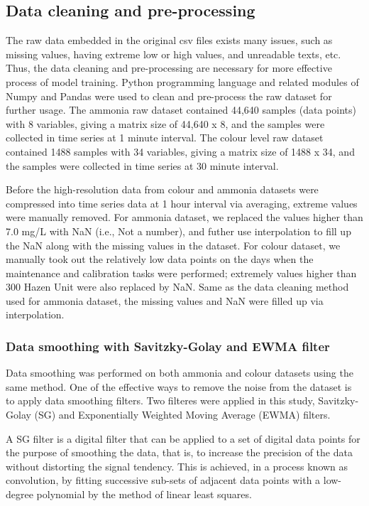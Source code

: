 \subsection{Data cleaning and pre-processing}
The raw data embedded in the original csv files exists many issues, such as missing values, having extreme low or high values, and unreadable texts, etc. Thus, the data cleaning and pre-processing are necessary for more effective process of model training. Python programming language and related modules of Numpy and Pandas were used to clean and pre-process the raw dataset for further usage. The ammonia raw dataset contained 44,640 samples (data points) with 8 variables, giving a matrix size of 44,640 x 8, and the samples were collected in time series at 1 minute interval. The colour level raw dataset contained 1488 samples with 34 variables, giving a matrix size of 1488 x 34, and the samples were collected in time series at 30 minute interval.

Before the high-resolution data from colour and ammonia datasets were compressed into time series data at 1 hour interval via averaging, extreme values were manually removed. For ammonia dataset, we replaced the values higher than 7.0 mg/L with NaN (i.e., Not a number), and futher use interpolation to fill up the NaN along with the missing values in the dataset. For colour dataset, we manually took out the relatively low data points on the days when the maintenance and calibration tasks were performed; extremely values higher than 300 Hazen Unit were also replaced by NaN. Same as the data cleaning method used for ammonia dataset, the missing values and NaN were filled up via interpolation. 

\subsubsection{Data smoothing with Savitzky-Golay and EWMA filter}
Data smoothing was performed on both ammonia and colour datasets using the same method. One of the effective ways to remove the noise from the dataset is to apply data smoothing filters. Two filteres were applied in this study, Savitzky-Golay (SG) and Exponentially Weighted Moving Average (EWMA) filters.

A SG filter is a digital filter that can be applied to a set of digital data points for the purpose of smoothing the data, that is, to increase the precision of the data without distorting the signal tendency. This is achieved, in a process known as convolution, by fitting successive sub-sets of adjacent data points with a low-degree polynomial by the method of linear least squares. \citep{wikipediaSavitzkyGolayFilter2022}

